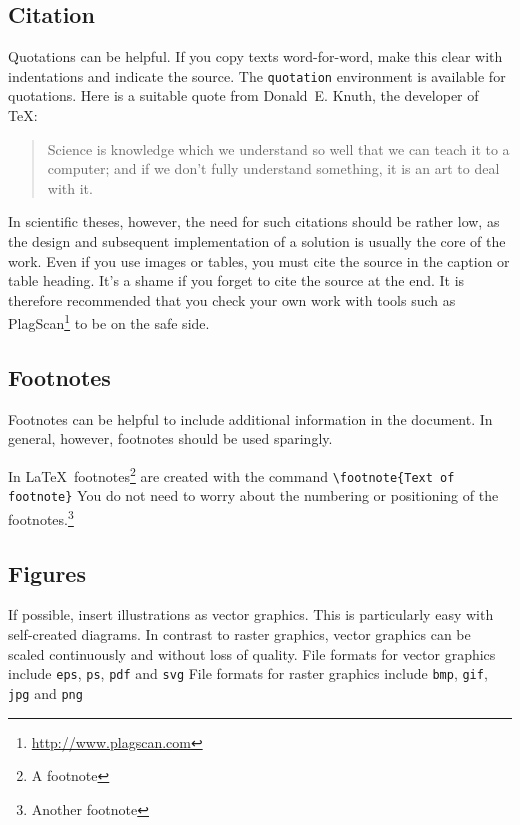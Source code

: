 \documentclass{llncs}
\begin{document}
\subsection{Citation}

Quotations can be helpful. If you copy texts word-for-word, make this clear with indentations and indicate the source. The \texttt{quotation} environment is available for quotations. Here is a suitable quote from Donald~E. Knuth, the developer of \TeX:

\begin{quotation}
Science is knowledge which we understand so well that we can teach it to a computer; and if we don't fully understand something, it is an art to deal with it.~\cite{Knuth1974}
\end{quotation}


In scientific theses, however, the need for such citations should be rather low, as the design and subsequent implementation of a solution is usually the core of the work. Even if you use images or tables, you must cite the source in the caption or table heading. It's a shame if you forget to cite the source at the end. It is therefore recommended that you check your own work with tools such as PlagScan\footnote{\url{http://www.plagscan.com}} to be on the safe side.

\subsection{Footnotes}

Footnotes can be helpful to include additional information in the document. In general, however, footnotes should be used sparingly.

In \LaTeX\, footnotes\footnote{A footnote} are created with the command \verb!\footnote{Text of footnote}! You do not need to worry about the numbering or positioning of the footnotes.\footnote{Another footnote}

\subsection{Figures}

If possible, insert illustrations as vector graphics. This is particularly easy with self-created diagrams. In contrast to raster graphics, vector graphics can be scaled continuously and without loss of quality. File formats for vector graphics include \verb!eps!, \verb!ps!, \verb!pdf! and \verb!svg! File formats for raster graphics include \verb!bmp!, \verb!gif!, \verb!jpg! and \verb!png!
\end{document}
